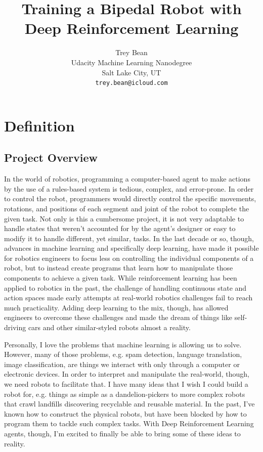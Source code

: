 \documentclass{article}
\title{Training a Bipedal Robot with Deep Reinforcement Learning}
\author{
  Trey Bean \\
  Udacity Machine Learning Nanodegree\\
  Salt Lake City, UT \\
  \texttt{trey.bean@icloud.com} \\
}
\begin{document}
\maketitle





\section{Definition}
\label{sec:definition}

\subsection{Project Overview}
In the world of robotics, programming a computer-based agent to make actions by the use of a rules-based system is tedious, complex, and error-prone. In order to control the robot, programmers would directly control the specific movements, rotations, and positions of each segment and joint of the robot to complete the given task. Not only is this a cumbersome project, it is not very adaptable to handle states that weren't accounted for by the agent's designer or easy to modify it to handle different, yet similar, tasks. In the last decade or so, though, advances in machine learning and specifically deep learning, have made it possible for robotics engineers to focus less on controlling the individual components of a robot, but to instead create programs that learn how to manipulate those components to achieve a given task. While reinforcement learning has been applied to robotics in the past, the challenge of handling continuous state and action spaces made early attempts at real-world robotics challenges fail to reach much practicality. Adding deep learning to the mix, though, has allowed engineers to overcome these challenges and made the dream of things like self-driving cars and other similar-styled robots almost a reality. 

Personally, I love the problems that machine learning is allowing us to solve. However, many of those problems, e.g. spam detection, language translation, image classification, are things we interact with only through a computer or electronic devices. In order to interpret and manipulate the real-world, though, we need robots to facilitate that. I have many ideas that I wish I could build a robot for, e.g. things as simple as a dandelion-pickers to more complex robots that crawl landfills discovering recyclable and reusable material. In the past, I've known how to construct the physical robots, but have been blocked by how to program them to tackle such complex tasks. With Deep Reinforcement Learning agents, though, I'm excited to finally be able to bring some of these ideas to reality.
\end{document}
